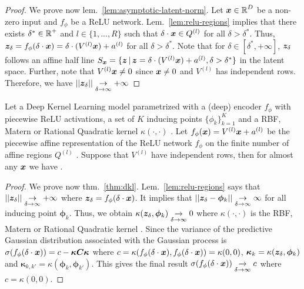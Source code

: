 \begin{proof}
We prove now lem.~\ref{lem:asymptotic-latent-norm}. Let $\bm{x} \in \operatorname{\mathbb{R}}^D $ be a non-zero input and $f_{\phi}$ be a ReLU network. Lem.~\ref{lem:relu-regions} implies that there exists $\delta^* \in \operatorname{\mathbb{R}}^{+}$ and $l \in \{1,..., R\}$ such that $\delta \cdot \bm{x} \in Q^{(l)}$ for all $\delta > \delta^*$. Thus, $\bm{z}_{\delta} = f_{\phi}(\delta \cdot \bm{x}) = \delta \cdot (V^{(l)} \bm{x}) + a^{(l)}$ for all $\delta > \delta^*$. Note that for $\delta\in [\delta^*, +\infty]$,  $\bm{z}_{\delta}$ follows an affine half line $S_{\bm{x}} = \{\bm{z} \,|\, \bm{z} = \delta \cdot (V^{(l)} \bm{x}) + a^{(l)}, \delta > \delta^* \}$ in the latent space. Further, note that $V^{(l)}\bm{x} \neq 0$ since $\bm{x} \neq 0$ and $V^{(l)}$ has independent rows. Therefore, we have $|| \bm{z}_\delta|| \underset{\delta \rightarrow \infty}{\rightarrow} + \infty$
\end{proof}

\begin{theorem}
\label{thm:dkl}
Let a Deep Kernel Learning model parametrized with a (deep) encoder $f_{\phi}$ with piecewise ReLU activations, a set of $K$ inducing points $\{\phi_{k}\}_{k=1}^{K}$ and a RBF, Matern or Rational Quadratic kernel $\kappa(\cdot, \cdot)$ \cite{expressing-structure-kernels, gp-for-ml}. Let $f_{\phi}(\bm{x})= V^{(l)}\bm{x} + a^{(l)}$ be the piecewise affine representation of the ReLU network $f_{\phi}$ on the finite number of affine regions $Q^{(l)}$ \citep{understanding-nn-relu}. Suppose that $V^{(l)}$ have independent rows, then for almost any $\bm{x}$ we have .
\end{theorem}

\begin{proof}
We prove now thm.~\ref{thm:dkl}. Lem.~\ref{lem:relu-regions} says that $||\bm{z}_\delta|| \underset{\delta \rightarrow \infty}{\rightarrow} + \infty$ where $\bm{z}_\delta=f_{\phi}(\delta \cdot \bm{x})$. It implies that $||\bm{z}_\delta - \bm{\phi}_k|| \underset{\delta \rightarrow \infty}{\rightarrow} \infty$ for all inducing point $\bm{\phi}_k$. Thus, we obtain $\kappa(\bm{z}_\delta, \bm{\phi}_k) \underset{\delta \rightarrow \infty}{\rightarrow} 0$ where $\kappa(\cdot, \cdot)$ is the RBF, Matern or Rational Quadratic kernel \cite{expressing-structure-kernels, gp-for-ml}. Since the variance of the predictive Gaussian distribution associated with the Gaussian process is $\sigma(f_{\phi}(\delta \cdot \bm{x})) = c - \bm{\kappa} \bm{C} \bm{\kappa}$ where $c = \kappa(f_{\phi}(\delta \cdot \bm{x}), f_{\phi}(\delta \cdot \bm{x})) = \kappa(0, 0)$, $\bm{\kappa}_k = \kappa(\bm{z}_\delta, \bm{\phi}_{k})$ and $\bm{\kappa}_{k, k'} = \kappa(\bm{\phi}_{k}, \bm{\phi}_{k'})$. This gives the final result $\sigma(f_{\phi}(\delta \cdot \bm{x})) \underset{\delta \rightarrow \infty}{\rightarrow} c$ where $ c = \kappa(0, 0)$.
\end{proof}

